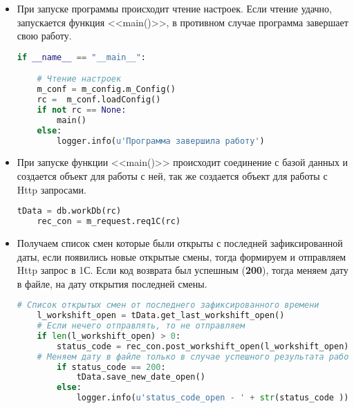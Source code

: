 \begin{itemize}
\item При запуске программы происходит чтение настроек. Если чтение удачно, запускается функция <<main()>>, в противном случае программа завершает свою работу.



\begin{tcolorbox}
	\begin{lstlisting}[language=Python,ndkeywordstyle=\color{darkgray}\bfseries,identifierstyle=\color{black},stringstyle=\color{red}\ttfamily,showstringspaces=false,keepspaces=true,extendedchars=\true]
if __name__ == "__main__":

	# Чтение настроек
	m_conf = m_config.m_Config()   
	rc =  m_conf.loadConfig()
	if not rc == None:
		main()
	else:
		logger.info(u'Программа завершила работу') 
	\end{lstlisting}
\end{tcolorbox}

\par

\item При запуске функции <<main()>> происходит соединение с базой данных и создается объект для работы с ней, так же создается объект для работы с Http запросами.

\begin{tcolorbox}
	\begin{lstlisting}[language=Python,ndkeywordstyle=\color{darkgray}\bfseries,identifierstyle=\color{black},stringstyle=\color{red}\ttfamily,showstringspaces=false,keepspaces=true,extendedchars=\true]
    tData = db.workDb(rc)
	rec_con = m_request.req1C(rc)
	\end{lstlisting}
\end{tcolorbox}


\item Получаем список смен которые были открыты с последней зафиксированной даты, если появились новые открытые смены, тогда формируем и отправляем Http запрос в 1С. 
Если код возврата был успешным (\textbf{200}), тогда меняем дату в файле, на дату открытия последней смены.

\begin{tcolorbox}
	\begin{lstlisting}[language=Python,ndkeywordstyle=\color{darkgray}\bfseries,identifierstyle=\color{black},stringstyle=\color{red}\ttfamily,showstringspaces=false,keepspaces=true,extendedchars=\true]
 # Список открытых смен от последнего зафиксированного времени
	l_workshift_open = tData.get_last_workshift_open()
	# Если нечего отправлять, то не отправляем
	if len(l_workshift_open) > 0:
		status_code = rec_con.post_workshift_open(l_workshift_open)
	# Меняем дату в файле только в случае успешного результата работы 1C
		if status_code == 200:
			tData.save_new_date_open()
		else:
			logger.info(u'status_code_open - ' + str(status_code ))
	\end{lstlisting}
\end{tcolorbox}



\end{itemize}
